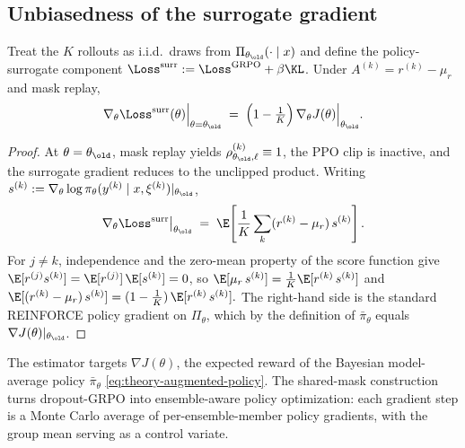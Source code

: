 \subsection{Unbiasedness of the surrogate gradient}
\label{sec:theory-unbiased}

\begin{theorem}
\label{thm:unbiased}
Treat the $K$ rollouts as i.i.d.\ draws from
$\Pi_{\theta_\old}(\cdot \mid x)$ and define the policy-surrogate
component
$\Loss^{\mathrm{surr}} := \Loss^{\mathrm{GRPO}} + \beta \KL$.  Under
$A^{(k)} = r^{(k)} - \mu_r$ and mask replay,
\begin{equation}
\nabla_\theta \Loss^{\mathrm{surr}}(\theta)\Big|_{\theta = \theta_\old}
   \;=\;
\Big(1 - \tfrac{1}{K}\Big)\,\nabla_\theta J(\theta)\Big|_{\theta_\old}.
\label{eq:theory-unbiased}
\end{equation}
\end{theorem}

\begin{proof}
At $\theta = \theta_\old$, mask replay yields
$\rho_{\theta_\old, \ell}^{(k)} \equiv 1$, the PPO clip is inactive,
and the surrogate gradient reduces to the unclipped product.  Writing
$s^{(k)} := \nabla_\theta \log \pi_\theta(y^{(k)} \mid x, \xi^{(k)})|_{\theta_\old}$,
\[
\nabla_\theta \Loss^{\mathrm{surr}}\big|_{\theta_\old}
   \;=\;
\E\!\left[\frac{1}{K}\sum_k (r^{(k)} - \mu_r)\, s^{(k)}\right].
\]
For $j \ne k$, independence and the zero-mean property of the score
function give
$\E[r^{(j)} s^{(k)}] = \E[r^{(j)}]\,\E[s^{(k)}] = 0$, so
$\E[\mu_r\, s^{(k)}] = \tfrac{1}{K}\E[r^{(k)}\, s^{(k)}]$ and
\(
\E[(r^{(k)} - \mu_r)\, s^{(k)}] = (1 - \tfrac{1}{K})\,\E[r^{(k)}\, s^{(k)}].
\)
The right-hand side is the standard REINFORCE policy gradient on
$\Pi_\theta$, which by the definition of $\bar\pi_\theta$ equals
$\nabla J(\theta)|_{\theta_\old}$.
\end{proof}

\begin{corollary}
\label{cor:marginal}
The estimator targets $\nabla J(\theta)$, the expected reward of the
Bayesian model-average policy $\bar\pi_\theta$
\eqref{eq:theory-augmented-policy}.  The shared-mask construction
turns dropout-GRPO into ensemble-aware policy optimization: each
gradient step is a Monte Carlo average of per-ensemble-member policy
gradients, with the group mean serving as a control variate.
\end{corollary}

